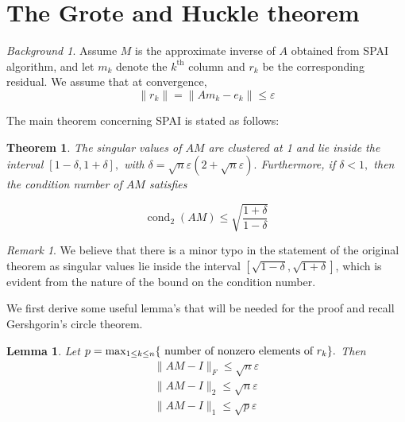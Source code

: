 \documentclass[paper=A4, fontsize=11pt]{scrartcl}
\let\originalleft\left
\let\originalright\right
\renewcommand{\left}{\mathopen{}\mathclose\bgroup\originalleft}
\renewcommand{\right}{\aftergroup\egroup\originalright}
\newtheorem{lemma}{Lemma}[section]
\newtheorem{theorem}{Theorem}[section]
\theoremstyle{remark}
\newtheorem*{rem}{Remark}
\newtheorem*{bgd}{Background}
\begin{document}
\newpage
	
	
\section{The Grote and Huckle theorem}

\begin{bgd} Assume $M$ is the approximate inverse of $A$ obtained from SPAI algorithm, and let $m_k$ denote the $k^{\text{th}}$ column and $r_k$ be the corresponding residual. We assume that at convergence, 
\begin{equation}\label{eq:conv}
\| r_k\| = \|A m_k- e_k\| \leq  \varepsilon 
\end{equation}
\end{bgd}
The main theorem concerning SPAI is stated as follows: 
\begin{theorem}
The singular values of \(A M\) are clustered at 1 and lie inside the
interval \([1-\delta, 1+\delta],\) with \(\delta=\sqrt{n} \varepsilon(2+\sqrt{n} \varepsilon) .\) Furthermore, if \(\delta<1,\) then the
condition number of \(A M\) satisfies

\begin{equation}
\operatorname{cond}_{2}(A M) \leq \sqrt{\frac{1+\delta}{1-\delta}}
\end{equation}


\end{theorem}

\begin{rem}
We believe that there is a minor typo in the statement of the original theorem as singular values lie inside the interval  \([\sqrt{1-\delta}, \sqrt{1+\delta}]\), which is evident from the nature of the bound on the condition number. 
\end{rem}

We first derive some useful lemma's that will be needed for the proof and recall Gershgorin's circle theorem. 

\begin{lemma}\label{lma:norms}
Let \(p=\max _{1 \leq k \leq n}\left\{\text { number of nonzero elements of } r_{k}\right\} .\) Then
\begin{align}
\|A M-I\|_{F} \leq \sqrt{n} \varepsilon \label{lem1a} \\
\|A M-I\|_{2} \leq \sqrt{n} \varepsilon \label{lem1b} \\
\|A M-I\|_{1}  \leq \sqrt{p} \varepsilon \label{lem1c}
\end{align}
\end{lemma}
\end{document}
